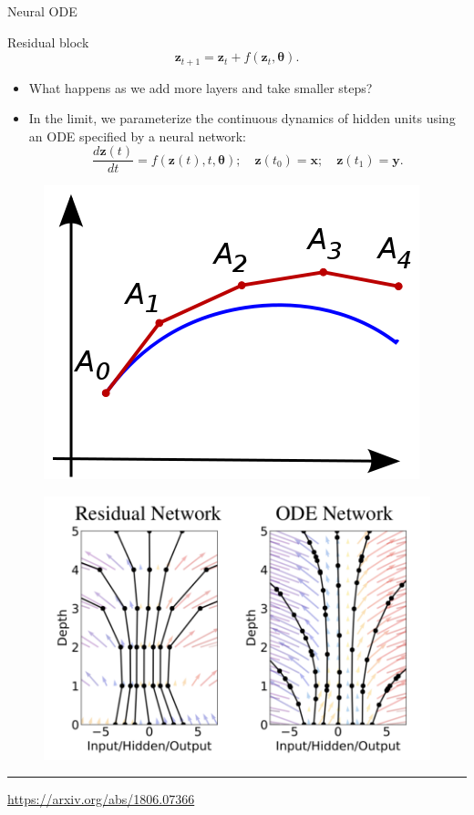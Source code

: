 \documentclass{beamer}
\newcommand{\bx}{\mathbf{x}}
\newcommand{\bz}{\mathbf{z}}
\newcommand{\by}{\mathbf{y}}
\newcommand{\btheta}{\boldsymbol{\theta}}
\begin{document}
\begin{frame}{Neural ODE}
	\begin{block}{Residual block}
	\vspace{-0.3cm}
	\[
	    \bz_{t+1} = \bz_t + f(\bz_t, \btheta).
	\]
	\vspace{-0.4cm}
	\end{block}
	\begin{itemize}
		\item What happens as we add more layers and take smaller steps? \\
		\item In the limit, we parameterize the continuous dynamics of hidden units using an ODE specified by a neural network: 
	\[
	    \frac{d \bz(t)}{dt} = f(\bz(t), t, \btheta); \quad \bz(t_0) = \bx; \quad \bz(t_1) = \by.
	\]
	\end{itemize}
	\begin{minipage}[t]{0.4\columnwidth}
		\begin{figure}
			\centering
			\includegraphics[width=0.9\linewidth]{figs/euler}
		\end{figure}
	\end{minipage}%
	\begin{minipage}[t]{0.6\columnwidth}
		\begin{figure}
			\centering
			\includegraphics[width=0.8\linewidth]{figs/resnet_vs_neural_ode.png}
		\end{figure}
	\end{minipage}
	\hrule\medskip
	{\scriptsize \href{https://arxiv.org/abs/1806.07366}{https://arxiv.org/abs/1806.07366}}   
\end{frame}
\end{document}
